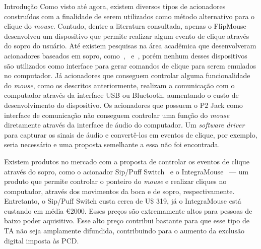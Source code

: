 \begin{chapter}{Introdução}
Como visto até agora, existem diversos tipos de acionadores construídos com a
finalidade de serem utilizados como método alternativo para o clique do
\textit{mouse}.  Contudo, dentre a literatura consultada, apenas o FlipMouse
desenvolveu um dispositivo que permite realizar algum evento de clique através
do sopro do usuário. Até existem pesquisas na área acadêmica que desenvolveram
acionadores baseados em sopro, como~\cite{Thaller13},~\cite{Mougharbel13}
e~\cite{Filho14}, porém nenhum desses dispositivos são utilizados como interface
para gerar comandos de clique para serem emulados no computador. Já acionadores
que conseguem controlar alguma funcionalidade do \textit{mouse}, 
como os descritos anteriormente,  realizam a comunicação com o computador 
através da interface USB ou Bluetooth, aumentando o custo de desenvolvimento do
dispositivo. Os acionadores que possuem o P2 Jack como interface de comunicação 
não conseguem controlar uma função do \textit{mouse} diretamente através da
interface de áudio do computador. Um \textit{software driver} para capturar os
sinais de áudio e convertê-los em eventos de clique, por exemplo, seria
necessário e uma proposta semelhante a essa não foi encontrada.    

Existem produtos no mercado com a proposta de controlar os eventos de
clique através do sopro, como o acionador Sip/Puff Switch~\cite{SipPuff} e o
IntegraMouse~\cite{IntegraMouse} --- um produto que permite controlar o ponteiro do
\textit{mouse} e realizar cliques no computador, através dos movimentos da boca
e de sopro, respectivamente. Entretanto, o Sip/Puff Switch custa cerca
de U\$ 319, já o IntegraMouse está custando em média \euro 2000. Esses preços
são extremamente altos para pessoas de baixo poder aquisitivo. Esse alto preço
contribui bastante para que esse tipo de TA não seja
amplamente difundida, contribuindo para o aumento da exclusão digital imposta às
PCD.



\end{chapter}
